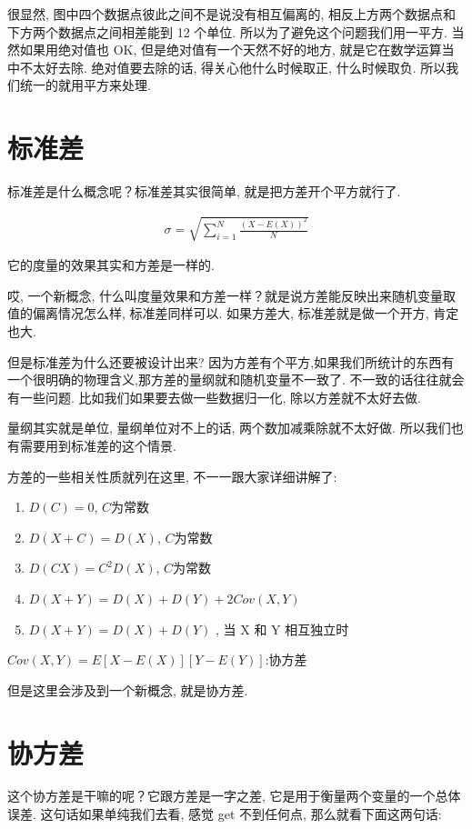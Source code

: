 很显然, 图中四个数据点彼此之间不是说没有相互偏离的, 相反上方两个数据点和下方两个数据点之间相差能到 12 个单位. 所以为了避免这个问题我们用一平方. 当然如果用绝对值也 OK, 但是绝对值有一个天然不好的地方, 就是它在数学运算当中不太好去除. 绝对值要去除的话, 得关心他什么时候取正, 什么时候取负. 所以我们统一的就用平方来处理. 

\section{标准差}

标准差是什么概念呢？标准差其实很简单, 就是把方差开个平方就行了. 

\begin{align*}
  \sigma = \sqrt{\sum_{i=1}^N \frac{(X-E(X))^2}{N}}
\end{align*}

它的度量的效果其实和方差是一样的. 

哎, 一个新概念, 什么叫度量效果和方差一样？就是说方差能反映出来随机变量取值的偏离情况怎么样, 标准差同样可以. 如果方差大, 标准差就是做一个开方, 肯定也大. 

但是标准差为什么还要被设计出来? 因为方差有个平方,如果我们所统计的东西有一个很明确的物理含义,那方差的量纲就和随机变量不一致了. 不一致的话往往就会有一些问题. 比如我们如果要去做一些数据归一化, 除以方差就不太好去做. 

量纲其实就是单位, 量纲单位对不上的话, 两个数加减乘除就不太好做. 所以我们也有需要用到标准差的这个情景. 

方差的一些相关性质就列在这里, 不一一跟大家详细讲解了: 

\begin{enumerate}
  \item $D(C) = 0$, $C$为常数
  \item $D(X+C) = D(X)$, $C$为常数
  \item $D(CX) = C^2 D(X)$, $C$为常数
  \item $D(X+Y) = D(X) + D(Y) + 2Cov(X, Y)$
  \item $D(X+Y) = D(X) + D(Y)$ , 当 X 和 Y 相互独立时 
\end{enumerate}

$Cov(X,Y)=E{[X-E(X)][Y-E(Y)]}$:协方差

但是这里会涉及到一个新概念, 就是协方差. 

\section{协方差}

这个协方差是干嘛的呢？它跟方差是一字之差, 它是用于衡量两个变量的一个总体误差. 这句话如果单纯我们去看, 感觉 get 不到任何点, 那么就看下面这两句话: 

